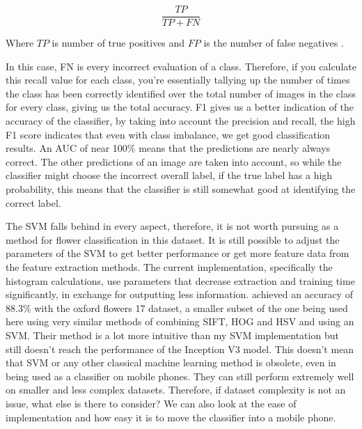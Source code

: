 \documentclass[12pt,a4paper]{report}
\begin{document}
\begin{equation}
    \frac{TP}{TP+FN}
\end{equation}

Where \(TP\) is number of true positives and \(FP\) is the number of false negatives \citep{googledevrecall}.

\par

In this case, FN is every incorrect evaluation of a class. Therefore, if you calculate this recall value for each class,
you're essentially tallying up the number of times the class has been correctly identified over the total number of 
images in the class for every class, giving us the total accuracy. F1 gives us a better indication of the accuracy of 
the classifier, by taking into account the precision and recall, the high F1 score indicates that even with class 
imbalance, we get good classification results. An AUC of near 100\% means that the predictions are nearly always 
correct. The other predictions of an image are taken into account, so while the classifier might choose the incorrect 
overall label, if the true label has a high probability, this means that the classifier is still somewhat good at 
identifying the correct label.

\par

The SVM falls behind in every aspect, therefore, it is not worth pursuing as a method for flower classification in this 
dataset. It is still possible to adjust the parameters of the SVM to get better performance or get more feature data 
from the feature extraction methods. The current implementation, specifically the histogram calculations, use parameters
that decrease extraction and training time significantly, in exchange for outputting less information. 
\citet{Nilsback2008}
achieved an accuracy of 88.3\% with the oxford flowers 17 dataset, a smaller subset of the one being used here using 
very similar methods of combining SIFT, HOG and HSV and using an SVM. Their method is a lot more intuitive than my SVM 
implementation but still doesn't reach the performance of the Inception V3 model. This doesn't mean that SVM or any 
other classical machine learning method is obsolete, even in being used as a classifier on mobile phones. They can still
perform extremely well on smaller and less complex datasets. Therefore, if dataset complexity is not an issue, what 
else is there to consider? We can also look at the ease of implementation and how easy it is to move the classifier 
into a mobile phone.
\end{document}
